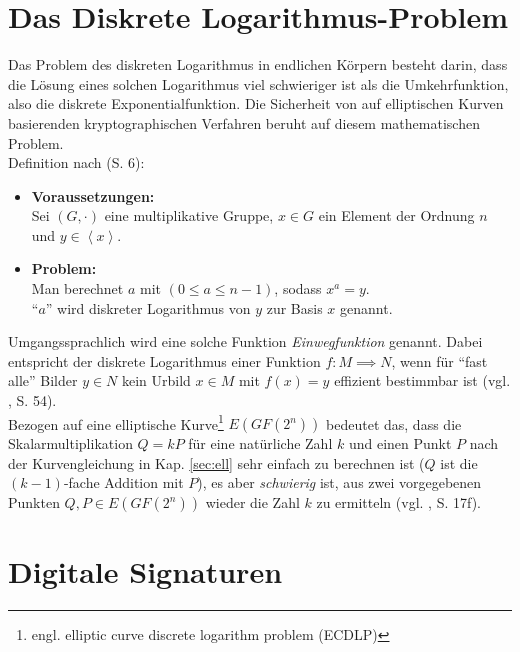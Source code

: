 \section{Das Diskrete Logarithmus-Problem} \label{sec:dlp}

Das Problem des diskreten Logarithmus in endlichen Körpern besteht darin, dass die Lösung eines solchen Logarithmus viel schwieriger ist als die Umkehrfunktion, also die diskrete Exponentialfunktion. Die Sicherheit von auf elliptischen Kurven basierenden kryptographischen Verfahren beruht auf diesem mathematischen Problem. \\

Definition nach \cite{baum} (S. 6):
\begin{itemize}
	\item \textbf{Voraussetzungen:}\\
	Sei $(G,\cdot)$ eine multiplikative Gruppe, $x \in G$ ein Element der Ordnung $n$ und $y \in \left \langle x \right \rangle$. \\
	\item \textbf{Problem:}\\
	Man berechnet $a$ mit $(0 \le a \le n-1)$, sodass $x^a = y$. \\
	``$a$'' wird diskreter Logarithmus von $y$ zur Basis $x$ genannt. \\
\end{itemize}

Umgangssprachlich wird eine solche Funktion \textit{Einwegfunktion} genannt. Dabei entspricht der diskrete Logarithmus einer Funktion $f: M \implies N$, wenn für ``fast alle'' Bilder $y \in N$ kein Urbild $x \in M$ mit $f(x) = y$ effizient bestimmbar ist (vgl. \cite{diskrlog}, S. 54). \\

Bezogen auf eine elliptische Kurve\footnote{engl. elliptic curve discrete logarithm problem (ECDLP)} $E(GF(2^n))$ bedeutet das, dass die Skalarmultiplikation $Q = k P$ für eine natürliche Zahl $k$ und einen Punkt $P$ nach der Kurvengleichung in Kap. \ref{sec:ell} sehr einfach zu berechnen ist ($Q$ ist die $(k-1)$-fache Addition mit $P$), es aber \textit{schwierig} ist, aus zwei vorgegebenen Punkten $Q, P \in E(GF(2^n))$ wieder die Zahl $k$ zu ermitteln (vgl. \cite{puttmann}, S. 17f). \\


\section{Digitale Signaturen}

